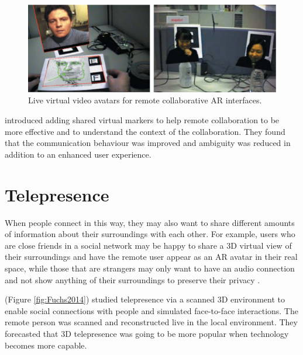 \begin{figure}
    \centering
    \includegraphics[width=\linewidth]{images/Billinghurst2002.PNG}
    \caption{Live virtual video avatars for remote collaborative AR interfaces. \cite{Billinghurst2002}}
    \label{fig:Billinghurst2002}
\end{figure}

\textcite{Muller2017} introduced adding shared virtual markers to help remote collaboration to be more effective and to understand the context of the collaboration. They found that the communication behaviour was improved and ambiguity was reduced in addition to an enhanced user experience. 

\section{Telepresence}      %

When people connect in this way, they may also want to share different amounts of information about their surroundings with each other. For example, users who are close friends in a social network may be happy to share a 3D virtual view of their surroundings and have the remote user appear as an AR avatar in their real space, while those that are strangers may only want to have an audio connection and not show anything of their surroundings to preserve their privacy \cite{Oetzel2011}. 

\textcite{Fuchs2014} (Figure \ref{fig:Fuchs2014}) studied telepresence via a scanned 3D environment to enable social connections with people and simulated face-to-face interactions. The remote person was scanned and reconstructed live in the local environment. They forecasted that 3D telepresence was going to be more popular when technology becomes more capable.


